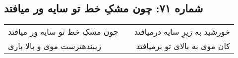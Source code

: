 \begin{center}
\section*{شماره ۷۱: چون مشکِ خط تو سایه ور میافتد}
\label{sec:071}
\begin{longtable}{l p{0.5cm} r}
چون مشکِ خط تو سایه ور میافتد
&&
خورشید به زیرِ سایه درمیافتد
\\
زیبندهترست موی و بالا باری
&&
کان موی به بالای تو برمیافتد
\\
\end{longtable}
\end{center}
